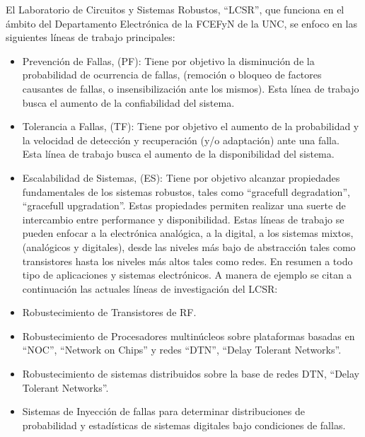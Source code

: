 El Laboratorio de Circuitos y Sistemas Robustos, ``LCSR'', que funciona en el ámbito del Departamento Electrónica de la FCEFyN de la UNC, se enfoco en las siguientes líneas de trabajo principales:
\begin{itemize}

    \item Prevención de Fallas, (PF): Tiene por objetivo la disminución de la probabilidad de ocurrencia de fallas, (remoción o bloqueo de factores causantes de fallas, o insensibilización ante los mismos). Esta línea de trabajo busca el aumento de la confiabilidad del sistema.
    \item Tolerancia a Fallas, (TF): Tiene por objetivo el aumento de la probabilidad y la velocidad de detección y recuperación (y/o adaptación) ante una falla. Esta línea de trabajo busca el aumento de la disponibilidad del sistema.
    \item Escalabilidad de Sistemas, (ES): Tiene por objetivo alcanzar propiedades fundamentales de los sistemas robustos, tales como ``gracefull degradation'', ``gracefull upgradation''. Estas propiedades permiten realizar una suerte de intercambio entre performance y disponibilidad.
Estas líneas de trabajo se pueden enfocar a la electrónica analógica, a la digital, a los sistemas mixtos, (analógicos y digitales), desde las niveles más bajo de abstracción tales como transistores hasta los niveles más altos tales como redes. En resumen a todo tipo de aplicaciones y sistemas electrónicos. A manera de ejemplo se citan a continuación las actuales líneas de investigación del LCSR:
    \item Robustecimiento de Transistores de RF.
    \item Robustecimiento de Procesadores multinúcleos sobre plataformas basadas en ``NOC'', ``Network on Chips'' y redes ``DTN'', ``Delay Tolerant Networks''.
    \item Robustecimiento de sistemas distribuidos sobre la base de redes DTN, ``Delay Tolerant Networks''.
    \item Sistemas de Inyección de fallas para determinar distribuciones de probabilidad y estadísticas de sistemas digitales bajo condiciones de fallas.
\end{itemize}
